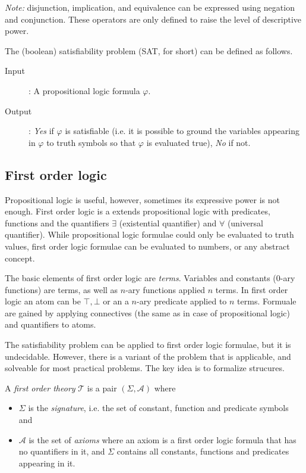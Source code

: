 \emph{Note:} disjunction, implication, and equivalence can be expressed using negation and conjunction. These operators are only defined to raise the level of descriptive power.

The (boolean) satisfiability problem (SAT, for short) can be defined as follows.
\begin{description}
	\item[Input]: A propositional logic formula $\varphi$.
	\item[Output]: \emph{Yes} if $\varphi$ is satisfiable (i.e. it is possible to ground the variables appearing in $\varphi$ to truth symbols so that $\varphi$ is evaluated true), \emph{No} if not.
\end{description}

\subsection{First order logic}

Propositional logic is useful, however, sometimes its expressive power is not enough. First order logic is a extends propositional logic with predicates, functions and the quantifiers $\exists$ (existential quantifier) and $\forall$ (universal quantifier). While propositional logic formulae could only be evaluated to truth values, first order logic formulae can be evaluated to numbers, or any abstract concept.

The basic elements of first order logic are \emph{terms}. Variables and constants (0-ary functions) are terms, as well as $n$-ary functions applied $n$ terms. In first order logic an atom can be $\top, \bot$ or an a $n$-ary predicate applied to $n$ terms. Formuale are gained by applying connectives (the same as in case of propositional logic) and quantifiers to atoms.

The satisfiability problem can be applied to first order logic formulae, but it is undecidable. However, there is a variant of the problem that is applicable, and solveable for most practical problems. The key idea is to formalize strucures.

\begin{dfn}
	A \emph{first order theory} $\mathcal{T}$ is a pair $(\Sigma,\mathcal{A})$  where
	\begin{itemize}
		\item $\Sigma$ is the \emph{signature}, i.e. the set of constant, function and predicate symbols and
		\item $\mathcal{A}$ is the set of \emph{axioms} where an axiom is a first order logic formula that has no quantifiers in it, and $\Sigma$ contains all constants, functions and predicates appearing in it.
	\end{itemize}
\end{dfn}

